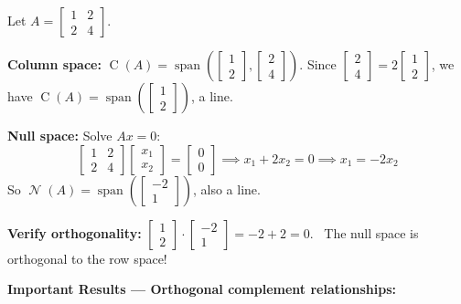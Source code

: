 \documentclass[11pt]{article}
\theoremstyle{definition}
\theoremstyle{plain}
\theoremstyle{remark}
\DeclareMathOperator{\spn}{span}
\DeclareMathOperator{\Null}{\mathcal{N}}
\DeclareMathOperator{\Col}{C}
\begin{document}
\begin{workedexample}[title=\textbf{Worked Example: Finding fundamental subspaces}]
Let $A = \begin{bmatrix}1 & 2\\2 & 4\end{bmatrix}$.

\textbf{Column space:} $\Col(A) = \spn\!\left(\begin{bmatrix}1\\2\end{bmatrix}, \begin{bmatrix}2\\4\end{bmatrix}\right)$. Since $\begin{bmatrix}2\\4\end{bmatrix} = 2\begin{bmatrix}1\\2\end{bmatrix}$, we have $\Col(A) = \spn\!\left(\begin{bmatrix}1\\2\end{bmatrix}\right)$, a line.

\textbf{Null space:} Solve $Ax = 0$:
\[
\begin{bmatrix}1 & 2\\2 & 4\end{bmatrix}\begin{bmatrix}x_1\\x_2\end{bmatrix} = \begin{bmatrix}0\\0\end{bmatrix} \implies x_1 + 2x_2 = 0 \implies x_1 = -2x_2
\]
So $\Null(A) = \spn\!\left(\begin{bmatrix}-2\\1\end{bmatrix}\right)$, also a line.

\textbf{Verify orthogonality:} $\begin{bmatrix}1\\2\end{bmatrix} \cdot \begin{bmatrix}-2\\1\end{bmatrix} = -2 + 2 = 0$. \checkmark\ The null space is orthogonal to the row space!
\end{workedexample}

\medskip
\textbf{Important Results --- Orthogonal complement relationships:}
\end{document}
